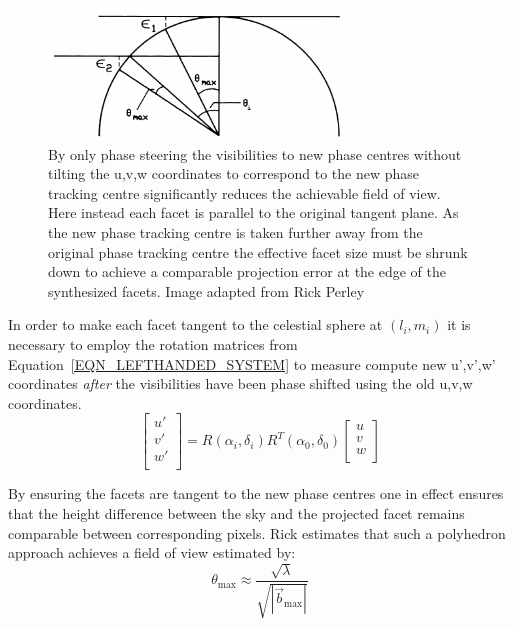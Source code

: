 \begin{figure}[h]
  \begin{mdframed}
    \centering
    \includegraphics[width=0.7\textwidth]{images/non_rotated_faceting.png}
    \caption[Faceting without regard of tangency]{By only phase steering the visibilities to new phase centres without tilting the u,v,w coordinates
    to correspond to the new phase tracking centre significantly reduces the achievable field of view. Here instead each facet is parallel to the 
    original tangent plane. As the new phase tracking centre is taken further away from the original phase tracking centre the effective facet size must be
    shrunk down to achieve a comparable projection error at the edge of the synthesized facets. Image adapted from Rick Perley \cite[Lecture 19]{taylor1999synthesis}}
    \label{fig_non_rotated_facets}
  \end{mdframed}
\end{figure}

In order to make each facet tangent to the celestial sphere at $(l_i,m_i)$ it is necessary to employ the rotation matrices from Equation~\ref{EQN_LEFTHANDED_SYSTEM}
to measure compute new u',v',w' coordinates \emph{after} the visibilities have been phase shifted using the old u,v,w coordinates.
\begin{equation}
 \left[\begin{array}{c}
	u'\\
	v'\\
	w'\\
       \end{array} \right] = R(\alpha_i,\delta_i)R^{T}(\alpha_0,\delta_0)\left[\begin{array}{c}
										u\\
										v \\
										w \\
									      \end{array}
									\right]
\end{equation}

By ensuring the facets are tangent to the new phase centres one in effect ensures that the height difference between the sky and the projected facet remains
comparable between corresponding pixels. Rick estimates that such a polyhedron approach achieves a field of view estimated by:
\begin{equation}
 \theta_{\text{max}} \approx \frac{\sqrt{\lambda}}{\sqrt{|\vec{b}_{\text{max}}|}}
\end{equation}

